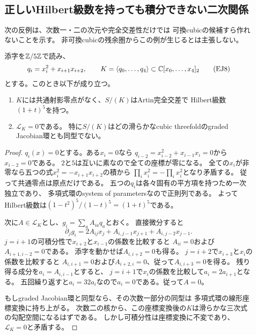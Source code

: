 \subsection{正しいHilbert級数を持っても積分できない二次関係}

次の反例は、次数一・二の次元や完全交差性だけでは
可換cubicの候補すら作れないことを示す。
非可換cubicの残余圏からこの例が生じるとは主張しない。

\begin{proposition}[五変数の積分不可能な完全交差]
\label{prop:ej-nonintegrable-ci}
添字を$\mathbb Z/5\mathbb Z$で読み、
\[
 q_i=x_i^2+x_{i+1}x_{i+2},\qquad
 K=\langle q_0,\ldots,q_4\rangle
 \subset\mathbb C[x_0,\ldots,x_4]_2
 \tag{EJ8}\label{eq:ej-cycle-example}
\]
とする。このとき以下が成り立つ。
\begin{enumerate}
 \item $K$には共通射影零点がなく、$S/(K)$はArtin完全交差で
 Hilbert級数$(1+t)^5$を持つ。
 \item $\mathcal L_K=0$である。
 特に$S/(K)$はどの滑らかなcubic threefoldのgraded Jacobian環とも同型でない。
\end{enumerate}
\end{proposition}
\begin{proof}
$q_i(x)=0$とする。ある$x_i=0$なら
$q_{i-2}=x_{i-2}^2+x_{i-1}x_i=0$から$x_{i-2}=0$である。
$2$と$5$は互いに素なので全ての座標が零になる。
全ての$x_i$が非零なら五つの式$x_i^2=-x_{i+1}x_{i+2}$の積から
$\prod_i x_i^2=-\prod_i x_i^2$となり矛盾する。
従って共通零点は原点だけである。
五つの$q_i$は各々固有の平方項を持つため一次独立であり、
多項式環のsystem of parametersなので正則列である。
よってHilbert級数は$(1-t^2)^5/(1-t)^5=(1+t)^5$である。

次に$A\in\mathcal L_K$とし、$g_i=\sum_aA_{ia}q_a$とおく。
直接微分すると
\[
 \partial_jg_i=2A_{ij}x_j+A_{i,j-1}x_{j+1}+A_{i,j-2}x_{j-1}.
 \tag{EJ9}\label{eq:ej-cycle-derivative}
\]
$j=i+1$の可積分性で$x_{i+2}$と$x_{i-1}$の係数を比較すると
$A_{ii}=0$および$A_{i+1,i-2}=0$である。
添字を動かせば$A_{i,i+2}=0$も得る。
$j=i+2$で$x_{i+3}$と$x_i$の係数を比較すると
$A_{i,i+1}=0$および$A_{i+2,i}=0$、従って$A_{i,i+3}=0$を得る。
残り得る成分を$a_i=A_{i,i-1}$とすると、
$j=i+1$で$x_i$の係数を比較して$a_i=2a_{i+1}$となる。
五回繰り返すと$a_i=32a_i$なので$a_i=0$である。従って$A=0$。

もしgraded Jacobian環と同型なら、その次数一部分の同型は
多項式環の線形座標変換に持ち上がる。
次数二の核から、この座標変換後の$K$は滑らかな三次式の勾配空間になるはずである。
しかし可積分性は座標変換に不変であり、$\mathcal L_K=0$と矛盾する。
\end{proof}

